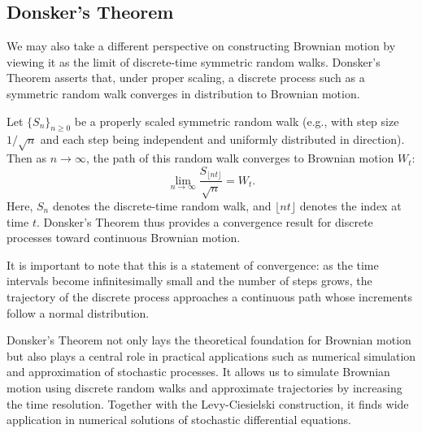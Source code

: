 \documentclass{article}
\begin{document}
\subsection{Donsker’s Theorem}

We may also take a different perspective on constructing Brownian motion by viewing it as the limit of discrete-time symmetric random walks. Donsker’s Theorem asserts that, under proper scaling, a discrete process such as a symmetric random walk converges in distribution to Brownian motion.

Let $\{S_n\}_{n \geq 0}$ be a properly scaled symmetric random walk (e.g., with step size $1/\sqrt{n}$ and each step being independent and uniformly distributed in direction). Then as $n \to \infty$, the path of this random walk converges to Brownian motion $W_t$:
\[
\lim_{n \to \infty} \frac{S_{\lfloor nt \rfloor}}{\sqrt{n}} = W_t.
\]
Here, $S_n$ denotes the discrete-time random walk, and $\lfloor nt \rfloor$ denotes the index at time $t$. Donsker’s Theorem thus provides a convergence result for discrete processes toward continuous Brownian motion.

It is important to note that this is a statement of convergence: as the time intervals become infinitesimally small and the number of steps grows, the trajectory of the discrete process approaches a continuous path whose increments follow a normal distribution.

Donsker’s Theorem not only lays the theoretical foundation for Brownian motion but also plays a central role in practical applications such as numerical simulation and approximation of stochastic processes. It allows us to simulate Brownian motion using discrete random walks and approximate trajectories by increasing the time resolution. Together with the Levy-Ciesielski construction, it finds wide application in numerical solutions of stochastic differential equations.
\end{document}

